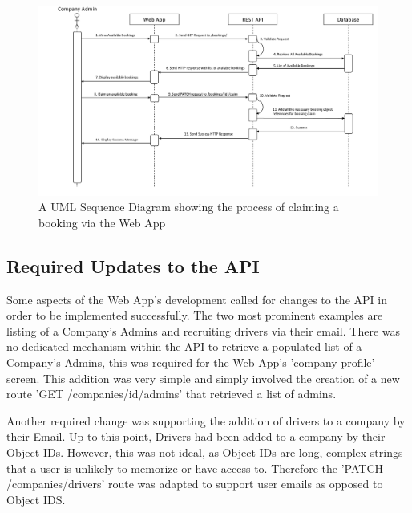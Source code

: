 \begin{figure}[!htb]
	\centering
	\includegraphics[width=\linewidth]{Resources/img/booking_claim_sequence.png}
	\caption{A UML Sequence Diagram showing the process of claiming a booking via the Web App}
	\label{fig:booking_claim_sequence}
\end{figure}

\subsection{Required Updates to the API}
Some aspects of the Web App's development called for changes to the API in order to be implemented successfully. The two most prominent examples are listing of a Company's Admins and recruiting drivers via their email. There was no dedicated mechanism within the API to retrieve a populated list of a Company's Admins, this was required for the Web App's 'company profile' screen. This addition was very simple and simply involved the creation of a new route 'GET /companies/{id}/admins' that retrieved a list of admins.

Another required change was supporting the addition of drivers to a company by their Email. Up to this point, Drivers had been added to a company by their Object IDs. However, this was not ideal, as Object IDs are long, complex strings that a user is unlikely to memorize or have access to. Therefore the 'PATCH /companies/drivers' route was adapted to support user emails as opposed to Object IDS.

